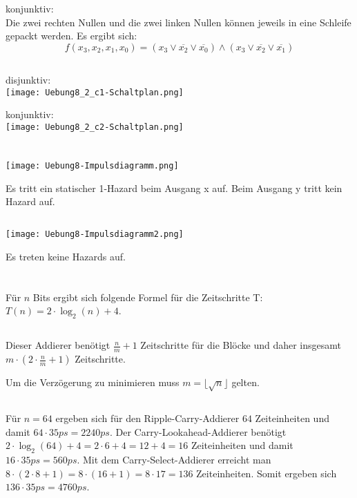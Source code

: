 \documentclass[10pt,a4paper,oneside,ngerman,numbers=noenddot]{scrartcl}
\begin{document}
konjunktiv:\\
Die zwei rechten Nullen und die zwei linken Nullen können jeweils in eine Schleife gepackt werden. Es ergibt sich:
\begin{equation*}
f(x_{3},x_{2},x_{1},x_{0}) = (x_{3} \vee \overline{x_{2}} \vee \overline{x_{0}}) \wedge (x_{3} \vee \overline{x_{2}} \vee \overline{x_{1}})
\end{equation*}
\subsection{} %
disjunktiv:\\
\texttt{[image: Uebung8\_2\_c1-Schaltplan.png]}

konjunktiv:\\
\texttt{[image: Uebung8\_2\_c2-Schaltplan.png]}
\section{} %
\subsection{} %
\texttt{[image: Uebung8-Impulsdiagramm.png]}

Es tritt ein statischer 1-Hazard beim Ausgang x auf. Beim Ausgang y tritt kein Hazard auf.
\subsection{} %
\texttt{[image: Uebung8-Impulsdiagramm2.png]}

Es treten keine Hazards auf.
\section{} %
\subsection{} %
Für $n$ Bits ergibt sich folgende Formel für die Zeitschritte T: $T(n) = 2 \cdot \log_{2} (n) + 4$.
\subsection{} %
Dieser Addierer benötigt $\frac{n}{m} + 1$ Zeitschritte für die Blöcke und daher insgesamt $m \cdot (2 \cdot \frac{n}{m} + 1)$ Zeitschritte.

Um die Verzögerung zu minimieren muss $m = \lfloor \sqrt{n} \rfloor$ gelten.
\subsection{} %
Für $n=64$ ergeben sich für den Ripple-Carry-Addierer $64$ Zeiteinheiten und damit $64 \cdot 35ps=2240ps$. Der Carry-Lookahead-Addierer benötigt $2 \cdot \log_{2} (64) + 4 = 2 \cdot 6 + 4 = 12 + 4 = 16$ Zeiteinheiten und damit $16 \cdot 35ps=560ps$.
Mit dem Carry-Select-Addierer erreicht man $8 \cdot (2\cdot 8 + 1) = 8 \cdot (16 + 1) = 8 \cdot 17 = 136$ Zeiteinheiten. Somit ergeben sich $136 \cdot 35ps=4760ps$.
\end{document}
